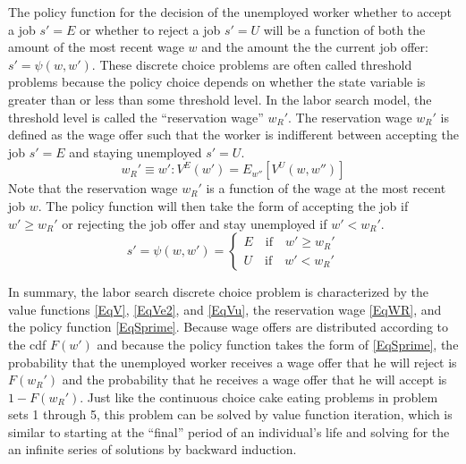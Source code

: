 The policy function for the decision of the unemployed worker whether to accept a job $s'=E$ or whether to reject a job $s'=U$ will be a function of both the amount of the most recent wage $w$ and the amount the the current job offer: $s' = \psi(w,w')$. These discrete choice problems are often called threshold problems because the policy choice depends on whether the state variable is greater than or less than some threshold level. In the labor search model, the threshold level is called the ``reservation wage'' $w_R'$. The reservation wage $w_R'$ is defined as the wage offer such that the worker is indifferent between accepting the job $s' = E$ and staying unemployed $s' = U$.
\begin{equation}\label{EqWR}
   w_R' \equiv w': V^E(w') = E_{w''}\left[V^U(w,w'')\right]
\end{equation}
Note that the reservation wage $w_R'$ is a function of the wage at the most recent job $w$. The policy function will then take the form of accepting the job if $w' \geq w_R'$ or rejecting the job offer and stay unemployed if $w' < w_R'$.
\begin{equation}\label{EqSprime}
   s' = \psi(w,w') = \begin{cases}
                      E \quad\text{if}\quad w' \geq w_R' \\
                      U \quad\text{if}\quad w' < w_R'
                   \end{cases}
\end{equation}

In summary, the labor search discrete choice problem is characterized by the value functions \eqref{EqV}, \eqref{EqVe2}, and \eqref{EqVu}, the reservation wage \eqref{EqWR}, and the policy function \eqref{EqSprime}. Because wage offers are distributed according to the cdf $F(w')$ and because the policy function takes the form of \eqref{EqSprime}, the probability that the unemployed worker receives a wage offer that he will reject is $F(w_R')$ and the probability that he receives a wage offer that he will accept is $1 - F(w_R')$. Just like the continuous choice cake eating problems in problem sets 1 through 5, this problem can be solved by value function iteration, which is similar to starting at the ``final'' period of an individual's life and solving for the an infinite series of solutions by backward induction.

